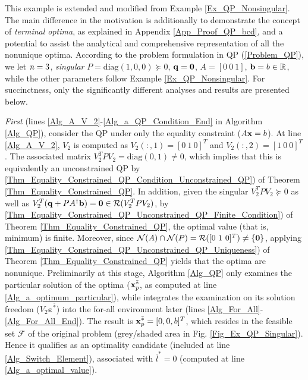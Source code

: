 \documentclass{imaman}
\newcommand{\bfb}{{\bf b}}
\newcommand{\bfx}{{\bf x}}
\newcommand{\bfq}{{\bf q}}
\newcommand{\bfvarepsilon}{{\boldsymbol \varepsilon}}
\newcommand{\bfzero}{{\bf 0}}
\newcommand{\real}{\mathbb{R}}
\newcommand{\calF}{{\mathcal F}}
\newcommand{\calN}{{\mathcal N}}
\newcommand{\calR}{{\mathcal R}}
\newcommand{\itn}{{\it n}}
\numberwithin{equation}{section}
\begin{document}
\begin{example}
This example is extended and modified from Example \ref{Ex_QP_Nonsingular}. The main difference in the motivation is additionally to demonstrate the concept of \textit{terminal optima}, as explained in Appendix \ref{App_Proof_QP_bcd}, and a potential to assist the analytical and comprehensive representation of all the nonunique optima. According to the problem formulation in QP (\ref{Problem_QP}), we let $\itn=3$, \textit{singular} $P=\mbox{diag}(1,0,0)\succeq 0$, $\bfq=\bfzero$, $A=[0~0~1]$, $\bfb=b\in\real$, while the other parameters follow Example \ref{Ex_QP_Nonsingular}. For succinctness, only the significantly different analyses and results are presented below.

\textit{First} (lines \ref{Alg_A_V_2}-\ref{Alg_a_QP_Condition_End} in Algorithm \ref{Alg_QP}), consider the QP under only the equality constraint ($A\bfx=b$). At line \ref{Alg_A_V_2}, $V_2$ is computed as $V_2(:,1)=[0~1~0]^T$ and $V_2(:,2)=[1~0~0]^T$. The associated matrix $V_2^TPV_2=\mbox{diag}(0,1)\ne 0$, which implies that this is equivalently an unconstrained QP by \ref{Thm_Equality_Constrained_QP_Condition_Unconstrained_QP}) of Theorem \ref{Thm_Equality_Constrained_QP}. In addition, given the singular $V_2^TPV_2\succeq 0$ as well as $V_2^T(\bfq+PA^\dagger\bfb)=\bfzero\in\calR(V_2^TPV_2)$, by \ref{Thm_Equality_Constrained_QP_Unconstrained_QP_Finite_Condition}) of Theorem \ref{Thm_Equality_Constrained_QP}, the optimal value (that is, minimum) is finite. Moreover, since $\calN(A)\cap\calN(P)=\calR([0~1~0]^T)\ne\{\bfzero\}$, applying \ref{Thm_Equality_Constrained_QP_Unconstrained_QP_Uniqueness}) of Theorem \ref{Thm_Equality_Constrained_QP} yields that the optima are nonunique. Preliminarily at this stage, Algorithm \ref{Alg_QP} only examines the particular solution of the optima ($\bfx_p^{\bar *}$, as computed at line \ref{Alg_a_optimum_particular}), while integrates the examination on its solution freedom ($V_2\bfvarepsilon^{\bar *}$) into the for-all environment later (lines \ref{Alg_For_All}-\ref{Alg_For_All_End}). The result is $\bfx_p^{\bar *}=[0,0,b]^T$, which resides in the feasible set $\calF$ of the original problem (grey/shaded area in Fig. \ref{Fig_Ex_QP_Singular}). Hence it qualifies as an optimality candidate (included at line \ref{Alg_Switch_Element}), associated with $\bar l^{*}=0$ (computed at line \ref{Alg_a_optimal_value}).


\end{example}
\end{document}
